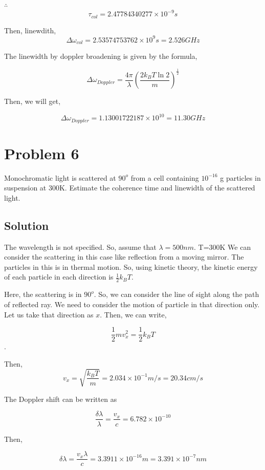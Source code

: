 \documentclass[a4paper,11pt]{article}
\begin{document}
\(\therefore\)
$$\tau_{col} = 2.47784340277\times10^{-9}s$$

Then, linewdith, $$\Delta\omega_{col} = 2.53574753762\times10^9 s= 2.526 GHz$$

The linewidth by doppler broadening is given by the formula,

\begin{equation}
\label{eq:orgb4f6f79}
\Delta\omega_{Doppler} = \frac{4\pi}{\lambda} \left(\frac{2 k_B T  \ln 2}{m}\right)^{\frac{1}{2}} 
\end{equation}

Then, we will get,

$$\Delta\omega_{Doppler} = 1.13001722187\times 10^{10} = 11.30 GHz$$

\newpage
\section*{Problem 6}
\label{sec:orgfdf335e}
Monochromatic light is scattered at \(90^o\) from a cell containing \(10^{-16}\) g particles in suspension at 300K. Estimate the coherence time and linewidth of the scattered light.
\subsection*{Solution}
\label{sec:org4439522}

The wavelength is not specified. So, assume that \(\lambda = 500nm\). T=300K
We can consider the scattering in this case like reflection from a moving mirror. The particles in this is in thermal motion. So, using kinetic theory, the kinetic energy of each particle in each direction is \(\frac{1}{2}k_BT\).

Here, the scattering is in \(90^o\). So, we can consider the line of sight along the path of reflected ray. We need to consider the motion of particle in that direction only. Let us take that direction as \(x\). Then, we can write,

$$\frac{1}{2} m v_x^2 = \frac{1}{2} k_B T$$.

Then, $$v_x = \sqrt{\frac{k_BT}{m}} = 2.034\times 10^{-1} m/s = 20.34cm/s$$

The Doppler shift can be written as

$$\frac{\delta\lambda}{\lambda} = \frac{v_x}{c} = 6.782\times10^{-10}$$

Then, 

$$\delta\lambda = \frac{v_x\lambda}{c} = 3.3911\times 10^{-16} m = 3.391\times 10^{-7}nm $$
\end{document}
